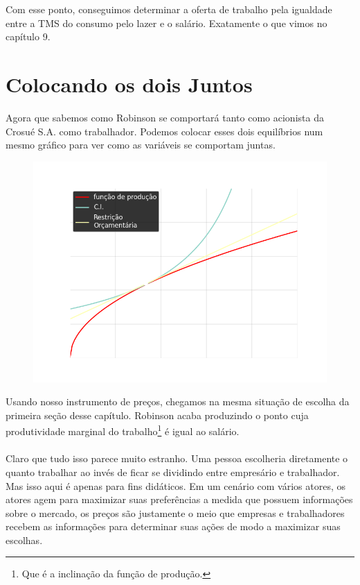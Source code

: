 \documentclass[a4paper,11pt,oneside]{book}
\theoremstyle{definition}
\theoremstyle{break}
\begin{document}
Com esse ponto, conseguimos determinar a oferta de trabalho pela igualdade entre a TMS do consumo pelo lazer e o salário. Exatamente o que vimos no capítulo 9.

\section{Colocando os dois Juntos}

Agora que sabemos como Robinson se comportará tanto como acionista da Crosué S.A. como trabalhador. Podemos colocar esses dois equilíbrios num mesmo gráfico para ver como as variáveis se comportam juntas.

\begin{figure}[H]
	\centering
	\includegraphics[scale=0.5]{cap33_5-equilibrio.png}
\end{figure}

Usando nosso instrumento de preços, chegamos na mesma situação de escolha da primeira seção desse capítulo. Robinson acaba produzindo o ponto cuja produtividade marginal do trabalho\footnote{Que é a inclinação da função de produção.} é igual ao salário.
\\~\\
Claro que tudo isso parece muito estranho. Uma pessoa escolheria diretamente o quanto trabalhar ao invés de ficar se dividindo entre empresário e trabalhador. Mas isso aqui é apenas para fins didáticos. Em um cenário com vários atores, os atores agem para maximizar suas preferências a medida que possuem informações sobre o mercado, os preços são justamente o meio que empresas e trabalhadores recebem as informações para determinar suas ações de modo a maximizar suas escolhas.
\end{document}
